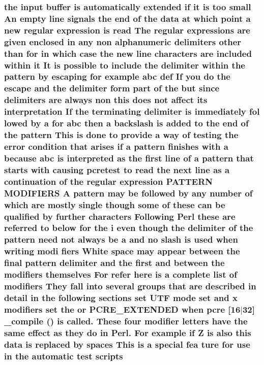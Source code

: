 \subsubsection[{\texorpdfstring{scripts}{scripts}}]{\setlength{\rightskip}{0pt plus 5cm}the {\bf input} {\bf buffer} {\bf is} automatically extended {\bf if} {\bf it} {\bf is} too small An {\bf empty} {\bf line} signals the {\bf end} {\bf of} the {\bf data} at {\bf which} {\bf point} {\bf a} new regular {\bf expression} {\bf is} {\bf read} The regular {\bf expressions} {\bf are} {\bf given} enclosed {\bf in} {\bf any} non {\bf alphanumeric} delimiters other {\bf than} for {\bf in} {\bf which} {\bf case} the new {\bf line} {\bf characters} {\bf are} {\bf included} within {\bf it} It {\bf is} {\bf possible} {\bf to} {\bf include} the delimiter within the {\bf pattern} by escaping for {\bf example} {\bf abc} def If you {\bf do} the escape and the delimiter form part {\bf of} the but since delimiters {\bf are} always non {\bf this} does {\bf not} affect its interpretation If the terminating delimiter {\bf is} immediately fol lowed by {\bf a} for {\bf abc} then {\bf a} {\bf backslash} {\bf is} added {\bf to} the {\bf end} {\bf of} the {\bf pattern} This {\bf is} {\bf done} {\bf to} provide {\bf a} {\bf way} {\bf of} testing the {\bf error} condition that {\bf arises} {\bf if} {\bf a} {\bf pattern} finishes {\bf with} {\bf a} because {\bf abc} {\bf is} interpreted {\bf as} the {\bf first} {\bf line} {\bf of} {\bf a} {\bf pattern} that starts {\bf with} causing {\bf pcretest} {\bf to} {\bf read} the next {\bf line} {\bf as} {\bf a} continuation {\bf of} the regular {\bf expression} P\+A\+T\+T\+E\+RN M\+O\+D\+I\+F\+I\+E\+RS {\bf A} {\bf pattern} may {\bf be} followed by {\bf any} {\bf number} {\bf of} {\bf which} {\bf are} mostly single {\bf though} some {\bf of} these {\bf can} {\bf be} qualified by further {\bf characters} Following {\bf Perl} these {\bf are} referred {\bf to} {\bf below} for the {\bf i} even {\bf though} the delimiter {\bf of} the {\bf pattern} need {\bf not} always {\bf be} {\bf a} and no {\bf slash} {\bf is} {\bf used} when writing modi fiers White {\bf space} may appear between the final {\bf pattern} delimiter and the {\bf first} and between the {\bf modifiers} {\bf themselves} For refer {\bf here} {\bf is} {\bf a} complete {\bf list} {\bf of} {\bf modifiers} They fall into several groups that {\bf are} described {\bf in} detail {\bf in} the following sections {\bf set} U\+TF {\bf mode} {\bf set} and {\bf x} {\bf modifiers} {\bf set} the {\bf or} {\bf P\+C\+R\+E\+\_\+\+E\+X\+T\+E\+N\+D\+ED} when {\bf pcre} \mbox{[}16$\vert$32\mbox{]} {\bf \+\_\+compile} () {\bf is} called. These four {\bf modifier} letters have the same effect {\bf as} they {\bf do} {\bf in} Perl. For {\bf example} {\bf if} Z {\bf is} also {\bf this} {\bf data} {\bf is} replaced by spaces This {\bf is} {\bf a} {\bf special} fea ture for use {\bf in} the automatic test scripts}\hypertarget{pcretest_8txt_ab38bb7c8bef8456778ba3b5559de3d0d}{}\label{pcretest_8txt_ab38bb7c8bef8456778ba3b5559de3d0d}
